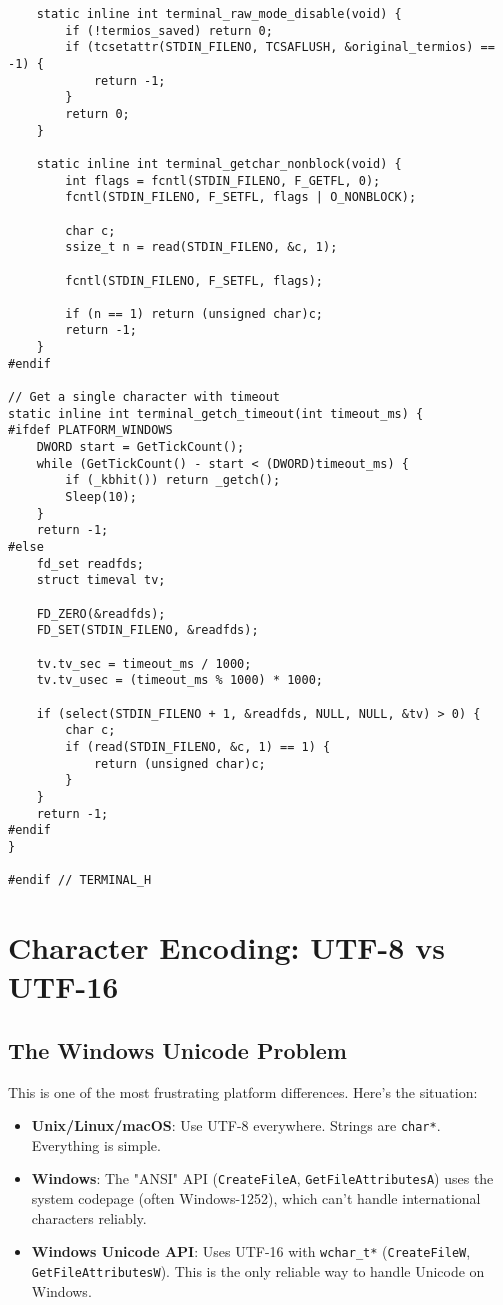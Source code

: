 \begin{lstlisting}
    static inline int terminal_raw_mode_disable(void) {
        if (!termios_saved) return 0;
        if (tcsetattr(STDIN_FILENO, TCSAFLUSH, &original_termios) == -1) {
            return -1;
        }
        return 0;
    }

    static inline int terminal_getchar_nonblock(void) {
        int flags = fcntl(STDIN_FILENO, F_GETFL, 0);
        fcntl(STDIN_FILENO, F_SETFL, flags | O_NONBLOCK);

        char c;
        ssize_t n = read(STDIN_FILENO, &c, 1);

        fcntl(STDIN_FILENO, F_SETFL, flags);

        if (n == 1) return (unsigned char)c;
        return -1;
    }
#endif

// Get a single character with timeout
static inline int terminal_getch_timeout(int timeout_ms) {
#ifdef PLATFORM_WINDOWS
    DWORD start = GetTickCount();
    while (GetTickCount() - start < (DWORD)timeout_ms) {
        if (_kbhit()) return _getch();
        Sleep(10);
    }
    return -1;
#else
    fd_set readfds;
    struct timeval tv;

    FD_ZERO(&readfds);
    FD_SET(STDIN_FILENO, &readfds);

    tv.tv_sec = timeout_ms / 1000;
    tv.tv_usec = (timeout_ms % 1000) * 1000;

    if (select(STDIN_FILENO + 1, &readfds, NULL, NULL, &tv) > 0) {
        char c;
        if (read(STDIN_FILENO, &c, 1) == 1) {
            return (unsigned char)c;
        }
    }
    return -1;
#endif
}

#endif // TERMINAL_H
\end{lstlisting}

\section{Character Encoding: UTF-8 vs UTF-16}

\subsection{The Windows Unicode Problem}

This is one of the most frustrating platform differences. Here's the situation:

\begin{itemize}
    \item \textbf{Unix/Linux/macOS}: Use UTF-8 everywhere. Strings are \texttt{char*}. Everything is simple.

    \item \textbf{Windows}: The "ANSI" API (\texttt{CreateFileA}, \texttt{GetFileAttributesA}) uses the system codepage (often Windows-1252), which can't handle international characters reliably.

    \item \textbf{Windows Unicode API}: Uses UTF-16 with \texttt{wchar\_t*} (\texttt{CreateFileW}, \texttt{GetFileAttributesW}). This is the only reliable way to handle Unicode on Windows.
\end{itemize}

